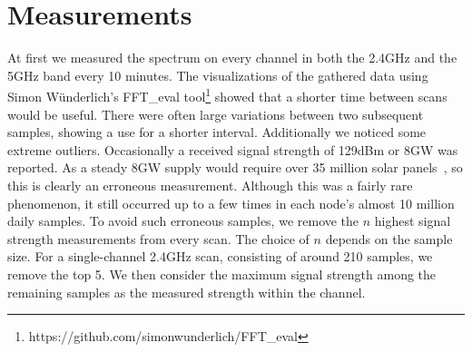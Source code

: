 \documentclass[a4paper, 11pt]{article}
\begin{document}
\section{Measurements}


At first we measured the spectrum on every channel in both the 2.4GHz and the 5GHz band every 10 minutes. The visualizations of the gathered data using Simon W{\"u}nderlich's FFT\_eval tool\footnote{https://github.com/simonwunderlich/FFT\_eval} showed that a shorter time between scans would be useful. There were often large variations between two subsequent samples, showing a use for a shorter interval. Additionally we noticed some extreme outliers. Occasionally a received signal strength of 129dBm or 8GW was reported. As a steady 8GW supply would require over 35 million solar panels~\cite{gigawatt}, so this is clearly an erroneous measurement. Although this was a fairly rare phenomenon, it still occurred up to a few times in each node's almost 10 million daily samples. To avoid such erroneous samples, we remove the $n$ highest signal strength measurements from every scan. The choice of $n$ depends on the sample size. For a single-channel 2.4GHz scan, consisting of around 210 samples, we remove the top 5. We then consider the maximum signal strength among the remaining samples as the measured strength within the channel. \\
\end{document}
